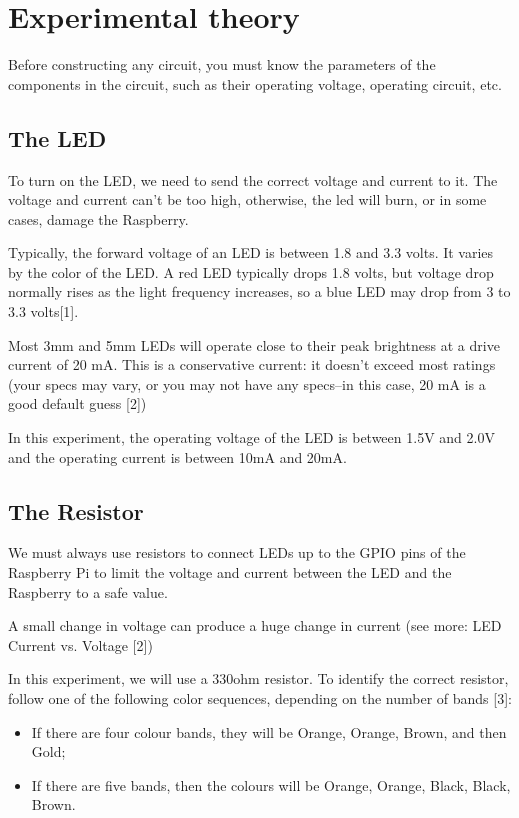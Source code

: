 \documentclass[10pt,twoside,english]{_support/latex/sbabook/sbabook}
\begin{document}
\section{Experimental theory}
Before constructing any circuit, you must know the parameters of the components in the circuit, such as their operating voltage, operating circuit, etc.
\subsection{The LED}
To turn on the LED, we need to send the correct voltage and current to it. The voltage and current can’t be too high, otherwise, the led will burn, or in some cases, damage the Raspberry.

Typically, the forward voltage of an LED is between 1.8 and 3.3 volts. It varies by the color of the LED. A red LED typically drops 1.8 volts, but voltage drop normally rises as the light frequency increases, so a blue LED may drop from 3 to 3.3 volts{[}1{]}.

Most 3mm and 5mm LEDs will operate close to their peak brightness at a drive current of 20 mA. This is a conservative current: it doesn’t exceed most ratings (your specs may vary, or you may not have any specs–in this case, 20 mA is a good default guess {[}2{]})

In this experiment, the operating voltage of the LED is between 1.5V and 2.0V and the operating current is between 10mA and 20mA.
\subsection{The Resistor}
We must always use resistors to connect LEDs up to the GPIO pins of the Raspberry Pi to limit the voltage and current between the LED and the Raspberry to a safe value.

A small change in voltage can produce a huge change in current (see more: LED Current vs. Voltage {[}2{]})

In this experiment, we will use a 330ohm resistor. To identify the correct resistor, follow one of the following color sequences, depending on the number of bands {[}3{]}:

\begin{itemize}
\item If there are four colour bands, they will be Orange, Orange, Brown, and then Gold;
\item If there are five bands, then the colours will be Orange, Orange, Black, Black, Brown.
\end{itemize}
\end{document}
